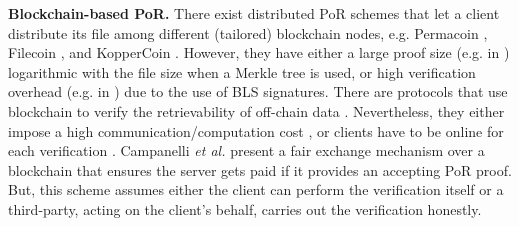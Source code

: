 
\noindent\textbf{Blockchain-based PoR.} There exist distributed PoR schemes that let a client  distribute its file among different (tailored) blockchain nodes,  e.g. Permacoin \cite{MillerPermacoin}, Filecoin  \cite{Filecoin}, and KopperCoin \cite{KoppBK16}. However,  they have either a large proof size (e.g. in \cite{MillerPermacoin,Filecoin})  logarithmic with the  file size when a  Merkle tree is used, or high verification overhead (e.g. in \cite{KoppBK16}) due to the use of BLS signatures. There are protocols that use blockchain to verify the retrievability of off-chain data \cite{RennerMK18,HaoXWJW18,ZhangDLZ18,Audita18,blockchain-data-audit-18,sia14}. Nevertheless, they either impose a high communication/computation cost \cite{RennerMK18,HaoXWJW18,Audita18,blockchain-data-audit-18,sia14}, or  clients have to be online for each verification  \cite{ZhangDLZ18}.  Campanelli \textit{et al.}  \cite{CampanelliGGN17}  present a fair exchange mechanism over a blockchain that ensures the server gets paid if it provides an accepting PoR proof. But, this scheme assumes either the client can   perform the verification itself or a third-party, acting on the client's behalf,  carries out the verification honestly. 

\vspace{-3mm}










